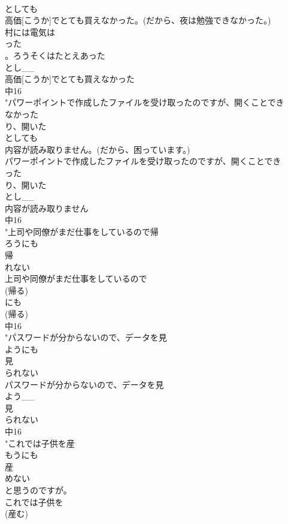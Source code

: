 \documentclass[8pt]{extreport}
\begin{document}
\begin{CJK}{UTF8}{min}
\\	としても
\\	高価[こうか]でとても買えなかった。(だから、夜は勉強できなかった。)
\\	村には電気は
\\	った
\\	。ろうそくはたとえあった
\\	とし__
\\	高価[こうか]でとても買えなかった
\\	中16
\\	"パワーポイントで作成したファイルを受け取ったのですが、開くことでき
\\	なかった
\\	り、開いた
\\	としても
\\	内容が読み取りません。(だから、困っています。)
\\	パワーポイントで作成したファイルを受け取ったのですが、開くことでき
\\	った
\\	り、開いた
\\	とし__
\\	内容が読み取りません
\\	中16
\\	"上司や同僚がまだ仕事をしているので帰
\\	ろうにも
\\	帰
\\	れない
\\	上司や同僚がまだ仕事をしているので
\\	(帰る)
\\	にも
\\	(帰る)
\\	中16
\\	"パスワードが分からないので、データを見
\\	ようにも
\\	見
\\	られない
\\	パスワードが分からないので、データを見
\\	よう__
\\	見
\\	られない
\\	中16
\\	"これでは子供を産
\\	もうにも
\\	産
\\	めない
\\	と思うのですが。
\\	これでは子供を
\\	(産む)

\end{CJK}
\end{document}
